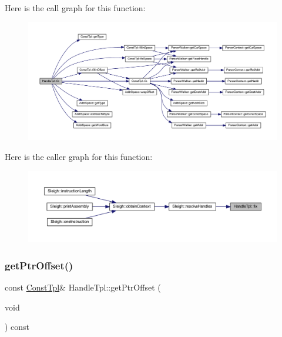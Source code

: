 Here is the call graph for this function\+:
\nopagebreak
\begin{figure}[H]
\begin{center}
\leavevmode
\includegraphics[width=350pt]{class_handle_tpl_ad63a0ce0388c46af005d036efc20758f_cgraph}
\end{center}
\end{figure}
Here is the caller graph for this function\+:
\nopagebreak
\begin{figure}[H]
\begin{center}
\leavevmode
\includegraphics[width=350pt]{class_handle_tpl_ad63a0ce0388c46af005d036efc20758f_icgraph}
\end{center}
\end{figure}
\mbox{\label{class_handle_tpl_abdf430c75dc094764836095bd4bc4a8c}} 
\subsubsection{\texorpdfstring{getPtrOffset()}{getPtrOffset()}}
{\footnotesize\ttfamily const \mbox{\hyperlink{class_const_tpl}{Const\+Tpl}}\& Handle\+Tpl\+::get\+Ptr\+Offset (\begin{DoxyParamCaption}\item[{void}]{ }\end{DoxyParamCaption}) const\hspace{0.3cm}{\ttfamily [inline]}}



